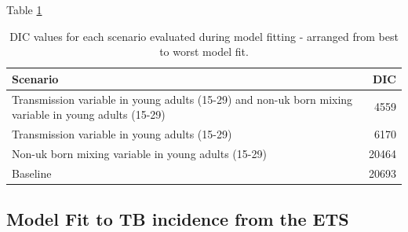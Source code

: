 \documentclass[11pt,twoside]{bristolthesis}
\begin{document}
  Table \ref{tab:09-scenarios-table}
  \begin{longtable}{>{\raggedright\arraybackslash}p{10cm}r}
  \caption{\label{tab:09-scenarios-table}DIC values for each scenario evaluated during model fitting - arranged from best to worst model fit.}\\
  \toprule
  Scenario & DIC\\
  \midrule
  Transmission variable in young adults (15-29) and non-uk born mixing variable in young adults (15-29) & 4559\\
  Transmission variable in young adults (15-29) & 6170\\
  Non-uk born mixing variable in young adults (15-29) & 20464\\
  Baseline & 20693\\
  \bottomrule
  \end{longtable}
  \hypertarget{model-fit-to-tb-incidence-from-the-ets}{%
  \subsection{Model Fit to TB incidence from the ETS}\label{model-fit-to-tb-incidence-from-the-ets}}
  
\end{document}
